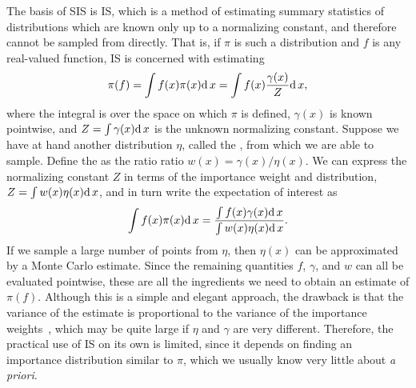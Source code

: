 The basis of \gls{SIS} is \gls{IS}, which is a method of estimating summary
statistics of distributions which are known only up to a normalizing constant,
and therefore cannot be sampled from directly. That is, if $\pi$ is such a
distribution and $f$ is any real-valued function, \gls{IS} is concerned with
estimating
\[
  \pi(f) = \int f(x)\pi(x)\mathrm{d}\, x = \int f(x) \frac{\gamma(x)}{Z} \mathrm{d}\, x,
\]
where the integral is over the space on which $\pi$ is defined, $\gamma(x)$ is
known pointwise, and $Z = \int \gamma(x) \mathrm{d}\, x$ is the unknown normalizing
constant. Suppose we have at hand another distribution $\eta$, called the
, from which we are able to sample. Define the
 as the ratio ratio $w(x) = \gamma(x)/\eta(x)$. We can
express the normalizing constant $Z$ in terms of the importance weight and
distribution, $Z = \int w(x) \eta(x) \mathrm{d}\, x$, and in turn write the expectation
of interest as
\[
  \int f(x) \pi(x) \mathrm{d}\, x = \frac{\int f(x) \gamma(x) \mathrm{d}\, x}
                               {\int w(x) \eta(x) \mathrm{d}\, x}.
\]
If we sample a large number of points from $\eta$, then $\eta(x)$ can be
approximated by a Monte Carlo estimate. Since the remaining quantities $f$,
$\gamma$, and $w$ can all be evaluated pointwise, these are all the ingredients
we need to obtain an estimate of $\pi(f)$. Although this is a simple and
elegant approach, the drawback is that the variance of the estimate is
proportional to the variance of the importance weights~\autocite{liu2008monte},
which may be quite large if $\eta$ and $\gamma$ are very different. Therefore,
the practical use of \gls{IS} on its own is limited, since it depends on
finding an importance distribution similar to $\pi$, which we usually know very
little about \textit{a priori}.

